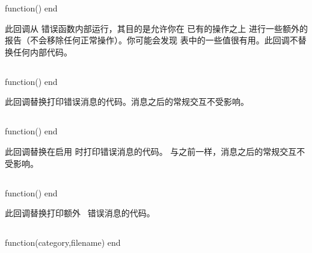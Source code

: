 
\begin{typing}
function()
end
\end{typing}

此回调从 \TEX 错误函数内部运行，其目的是允许你在 \TEX 已有的操作之上
进行一些额外的报告（不会移除任何正常操作）。你可能会发现 
表中的一些值很有用。此回调不替换任何内部代码。

\subsection{}


\begin{typing}
function()
end
\end{typing}

此回调替换打印错误消息的代码。消息之后的常规交互不受影响。

\subsection{}


\begin{typing}
function()
end
\end{typing}

此回调替换在启用  时打印错误消息的代码。
与之前一样，消息之后的常规交互不受影响。

\subsection{}


\begin{typing}
function()
end
\end{typing}

此回调替换打印额外 \LUA\ 错误消息的代码。

\subsection{}


\begin{typing}
function(category,filename)
end
\end{typing}

